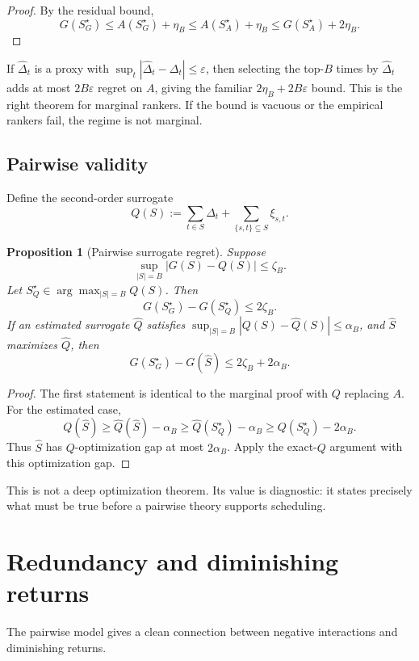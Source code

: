 \documentclass[11pt]{article}
\newtheorem{proposition}{Proposition}
\newcommand{\1}{\mathbf 1}
\begin{document}
\begin{proof}
By the residual bound,
\[
G(S_G^\star)\le A(S_G^\star)+\eta_B
\le A(S_A^\star)+\eta_B
\le G(S_A^\star)+2\eta_B.
\]
\end{proof}

If \(\widehat{\Delta}_t\) is a proxy with
\(\sup_t|\widehat{\Delta}_t-\Delta_t|\le \varepsilon\), then selecting the
top-\(B\) times by \(\widehat{\Delta}_t\) adds at most \(2B\varepsilon\) regret
on \(A\), giving the familiar \(2\eta_B+2B\varepsilon\) bound.  This is the
right theorem for marginal rankers.  If the bound is vacuous or the empirical
rankers fail, the regime is not marginal.

\subsection{Pairwise validity}

Define the second-order surrogate
\[
  Q(S):=\sum_{t\in S}\Delta_t
  +\sum_{\{s,t\}\subseteq S}\xi_{s,t}.
\]

\begin{proposition}[Pairwise surrogate regret]
Suppose
\[
  \sup_{|S|=B}|G(S)-Q(S)|\le \zeta_B.
\]
Let \(S_Q^\star\in\arg\max_{|S|=B}Q(S)\).  Then
\[
  G(S_G^\star)-G(S_Q^\star)\le 2\zeta_B.
\]
If an estimated surrogate \(\widehat Q\) satisfies
\(\sup_{|S|=B}|Q(S)-\widehat Q(S)|\le\alpha_B\), and
\(\widehat S\) maximizes \(\widehat Q\), then
\[
  G(S_G^\star)-G(\widehat S)\le 2\zeta_B+2\alpha_B.
\]
\end{proposition}

\begin{proof}
The first statement is identical to the marginal proof with \(Q\) replacing
\(A\).  For the estimated case,
\[
Q(\widehat S)
\ge
\widehat Q(\widehat S)-\alpha_B
\ge
\widehat Q(S_Q^\star)-\alpha_B
\ge
Q(S_Q^\star)-2\alpha_B.
\]
Thus \(\widehat S\) has \(Q\)-optimization gap at most \(2\alpha_B\).  Apply
the exact-\(Q\) argument with this optimization gap.
\end{proof}

This is not a deep optimization theorem.  Its value is diagnostic: it states
precisely what must be true before a pairwise theory supports scheduling.

\section{Redundancy and diminishing returns}

The pairwise model gives a clean connection between negative interactions and
diminishing returns.
\end{document}
